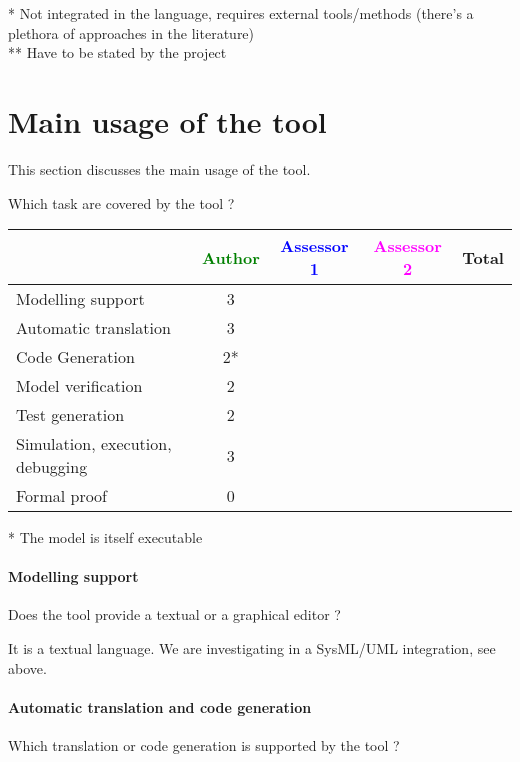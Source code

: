 \begin{author_comment}
 * Not integrated in the language, requires external tools/methods (there's a plethora of approaches in the literature)\\
 ** Have to be stated by the project
\end{author_comment}

\section{Main usage of the tool}
\label{main_usage}

This section discusses the main usage of the tool.

Which task are covered by the tool ?


\begin{tabular}{|l | c | c | c | c|}
\hline
& \textcolor{green}{Author} & \textcolor{blue}{Assessor 1} & \textcolor{magenta}{Assessor 2} & Total \\
\hline 
Modelling support &3 & & &  \\
\hline
Automatic translation  &3 & & & \\
\hline
Code Generation  &2* & & & \\
\hline
Model verification &2 & & & \\
\hline
Test generation &2 & & & \\
\hline
Simulation, execution, debugging &3 & & & \\
\hline
Formal proof &0 & & & \\
\hline
\end{tabular}

\begin{author_comment}
 * The model is itself executable
\end{author_comment}

\paragraph{Modelling support}
Does the tool provide a  textual or a graphical editor ?

It is a textual language. We are investigating in a SysML/UML integration, see above.

\paragraph{Automatic translation and code generation}
Which translation or code generation is supported by the tool ?

